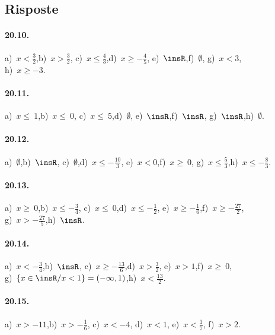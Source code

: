\subsection{Risposte}
\paragraph{20.10.} a)~$x<\frac{3}{2}$,\quad b)~$x>\frac{3}{2}$,\quad
c)~$x\le \frac{4}{3}$,\quad d)~$x\ge -{\frac{4}{5}}$,\quad
e)~$\insR$,\quad f)~$\emptyset $,\quad
g)~$x<3$,\quad \protect\\ h)~$x\ge -3$.

\paragraph{20.11.} a)~$x\le~1$,\quad b)~$x\le~0$,\quad
c)~$x\le~5$,\quad d)~$\emptyset $,\quad
e)~$\insR$,\quad f)~$\insR$,\quad
g)~$\insR $,\quad h)~$\emptyset $.

\paragraph{20.12.} a)~$\emptyset $,\quad b)~$\insR$,\quad
c)~$\emptyset $,\quad d)~$x\le -{\frac{10}{3}}$,\quad
e)~$x<0$,\quad f)~$x\ge~0$,\quad
g)~$x\le \frac{5}{3}$,\quad h)~$x\le -{\frac{8}{3}}$.

\paragraph{20.13.} a)~$x\ge~0$,\quad b)~$x\le -{\frac{3}{4}}$,\quad
c)~$x\le~0$,\quad d)~$x\le -{\frac{1}{2}}$,\quad
e)~$x\ge -{\frac{1}{6}}$,\quad f)~$x\ge -{\frac{27}{2}}$,\quad
\protect\\g)~$x>-{\frac{27}{5}}$,\quad h)~$\insR$.

\paragraph{20.14.} a)~$x<-{\frac{3}{4}}$,\quad b)~$\insR$,\quad
c)~$x\ge -{\frac{13}{6}}$,\quad d)~$x>\frac{3}{2}$,\quad
e)~$x>1$,\quad f)~$x\ge~0$,\quad\protect\\
g)~$\{x\in\insR/x<1\}=(-\infty,1)$,\quad h)~$x<\frac{13}{2}$.

\paragraph{20.15.} a)~$x>-11$,\quad b)~$x>-{\frac{1}{6}}$,\quad
c)~$x<-4$, \quad d)~$x<1$, \quad e)~$x<\frac{1}{7}$, \quad f)~$x>2$.

